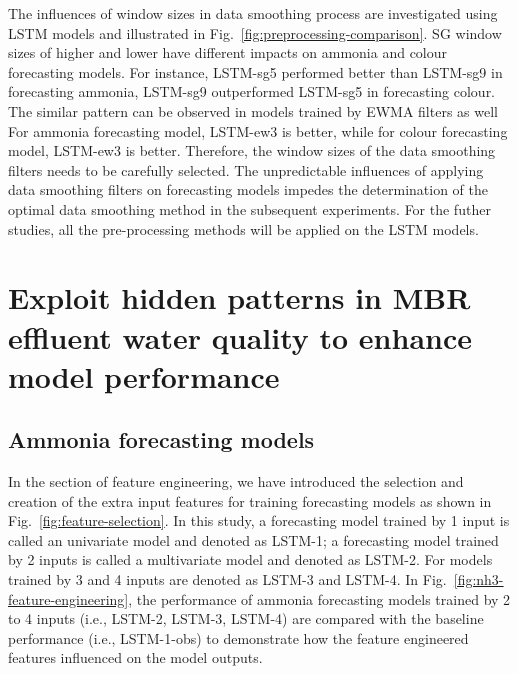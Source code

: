 The influences of window sizes in data smoothing process are investigated using LSTM models and illustrated in Fig.~\ref{fig:preprocessing-comparison}. SG window sizes of higher and lower have different impacts on ammonia and colour forecasting models. For instance, LSTM-sg5 performed better than LSTM-sg9 in forecasting ammonia, LSTM-sg9 outperformed LSTM-sg5 in forecasting colour. The similar pattern can be observed in models trained by EWMA filters as well For ammonia forecasting model, LSTM-ew3 is better, while for colour forecasting model, LSTM-ew3 is better. Therefore, the window sizes of the data smoothing filters needs to be carefully selected. The unpredictable influences of applying data smoothing filters on forecasting models impedes the determination of the optimal data smoothing method in the subsequent experiments. For the futher studies, all the pre-processing methods will be applied on the LSTM models.

\section{Exploit hidden patterns in MBR effluent water quality to enhance model performance}
\subsection{Ammonia forecasting models}
In the section of feature engineering, we have introduced the selection and creation of the extra input features for training forecasting models as shown in Fig.~\ref{fig:feature-selection}. In this study, a forecasting model trained by 1 input is called an univariate model and denoted as LSTM-1; a forecasting model trained by 2 inputs is called a multivariate model and denoted as LSTM-2. For models trained by 3 and 4 inputs are denoted as LSTM-3 and LSTM-4. In Fig.~\ref{fig:nh3-feature-engineering}, the performance of ammonia forecasting models trained by 2 to 4 inputs (i.e., LSTM-2, LSTM-3, LSTM-4) are compared with the baseline performance (i.e., LSTM-1-obs) to demonstrate how the feature engineered features influenced on the model outputs. 

